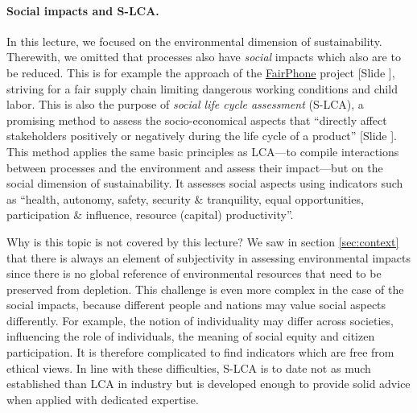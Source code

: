 \documentclass{article}
\newcounter{slide}
\begin{document}
\paragraph{Social impacts and S-LCA.} In this lecture, we focused on the environmental dimension of sustainability. Therewith, we omitted that processes also have \emph{social} impacts which also are to be reduced. This is for example the approach of the \href{https://www.fairphone.com/en/}{FairPhone} project {\color{blue}[Slide ]}, striving for a fair supply chain limiting dangerous working conditions and child labor. This is also the purpose of \emph{social life cycle assessment} (S-LCA), a promising method to assess the socio-economical aspects that ``directly affect stakeholders positively or negatively during the life cycle of a product'' \cite{andrews2010guidelines} {\color{blue}[Slide ]}. This method applies the same basic principles as LCA---to compile interactions between processes and the environment and assess their impact---but on the social dimension of sustainability. It assesses social aspects using indicators such as ``health, autonomy, safety, security \& tranquility, equal opportunities, participation \& influence, resource (capital) productivity''. 

Why is this topic is not covered by this lecture? We saw in section \ref{sec:context} that there is always an element of subjectivity in assessing environmental impacts since there is no global reference of environmental resources that need to be preserved from depletion. This challenge is even more complex in the case of the social impacts, because different people and nations may value social aspects differently. For example, the notion of individuality may differ across societies, influencing the role of individuals, the meaning of social equity and citizen participation. It is therefore complicated to find indicators which are free from ethical views. In line with these difficulties, S-LCA is to date not as much established than LCA in industry but is developed enough to provide solid advice when applied with dedicated expertise. 
\end{document}
